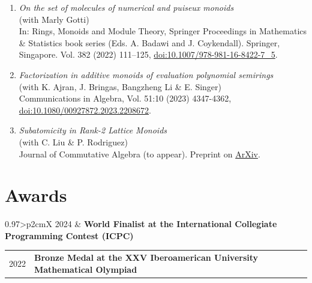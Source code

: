 \documentclass[12pt]{amsart}
\theoremstyle{definition}
\numberwithin{equation}{section}
\newcommand{\gray}{\rowcolor[gray]{.90}} %
\begin{document}
	\begin{enumerate}
		\item	\textit{On the set of molecules of numerical and puiseux monoids} \\(with Marly Gotti)\\ In: Rings, Monoids and Module Theory, Springer Proceedings in Mathematics \& Statistics book series (Eds. A. Badawi and J.
		Coykendall). Springer, Singapore. Vol. 382 (2022) 111–125, \href{https://doi.org/10.1007/978-981-16-8422-7_5}{doi:10.1007/978-981-16-8422-7\_5}.
		
		\item \textit{Factorization in additive monoids of evaluation polynomial semirings} \\ (with K. Ajran, J. Bringas, Bangzheng Li \& E. Singer) \\ Communications in Algebra, Vol. 51:10 (2023) 4347-4362, \href{https://doi.org/10.1080/00927872.2023.2208672}{doi:10.1080/00927872.2023.2208672}. 
		
		\item \textit{Subatomicity in Rank-2 Lattice Monoids} \\(with C. Liu \& P. Rodriguez)\\ Journal of Commutative Algebra (to appear). Preprint on \href{https://arxiv.org/abs/2308.01459}{ArXiv}. 
		
	\end{enumerate}



\section{Awards}

	\begin{tabularx}{0.97\linewidth}{>{\raggedleft\scshape}p{2cm}X}
		\gray 2024 & \textbf{World Finalist at the International Collegiate Programming Contest (ICPC)}\\
	\end{tabularx}

	\begin{tabularx}{0.97\linewidth}{>{\raggedleft\scshape}p{2cm}X}
		\gray 2022 & \textbf{Bronze Medal at the XXV Iberoamerican University Mathematical Olympiad}\\
	\end{tabularx}
	
\end{document}
